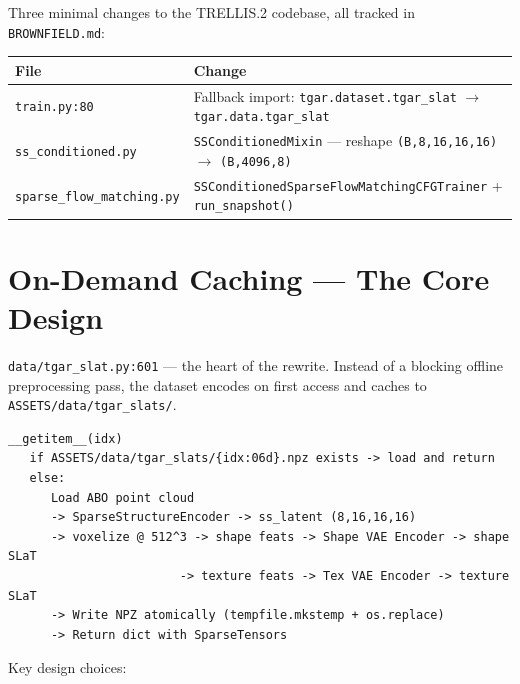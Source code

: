 Three minimal changes to the TRELLIS.2 codebase, all tracked in
\texttt{BROWNFIELD.md}:

\begin{tabular}{ll}
\toprule
File & Change \\
\midrule
\texttt{train.py:80} & Fallback import: \texttt{tgar.dataset.tgar\_slat} $\rightarrow$ \texttt{tgar.data.tgar\_slat} \\
\texttt{ss\_conditioned.py} & \texttt{SSConditionedMixin} --- reshape \texttt{(B,8,16,16,16)} $\rightarrow$ \texttt{(B,4096,8)} \\
\texttt{sparse\_flow\_matching.py} & \texttt{SSConditionedSparseFlowMatchingCFGTrainer} + \texttt{run\_snapshot()} \\
\bottomrule
\end{tabular}

\section{On-Demand Caching --- The Core Design}

\texttt{data/tgar\_slat.py:601} --- the heart of the rewrite. Instead of a blocking
offline preprocessing pass, the dataset encodes on first access and caches
to \texttt{ASSETS/data/tgar\_slats/}.

\begin{lstlisting}
__getitem__(idx)
   if ASSETS/data/tgar_slats/{idx:06d}.npz exists -> load and return
   else:
      Load ABO point cloud
      -> SparseStructureEncoder -> ss_latent (8,16,16,16)
      -> voxelize @ 512^3 -> shape feats -> Shape VAE Encoder -> shape SLaT
                        -> texture feats -> Tex VAE Encoder -> texture SLaT
      -> Write NPZ atomically (tempfile.mkstemp + os.replace)
      -> Return dict with SparseTensors
\end{lstlisting}

Key design choices:

